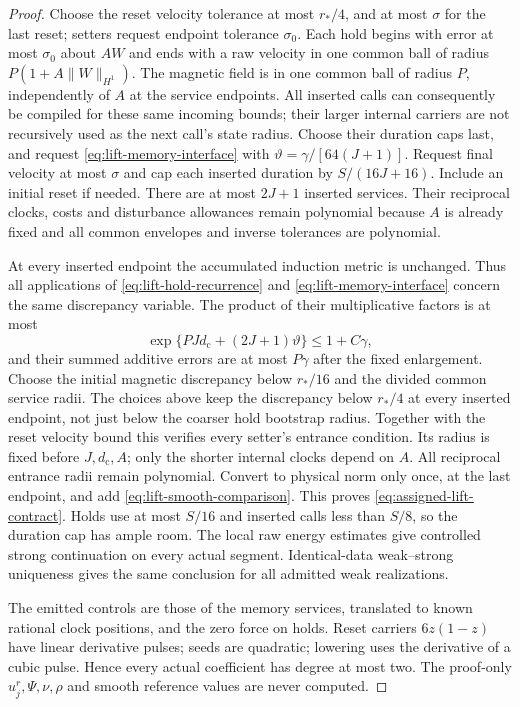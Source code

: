\documentclass[11pt,a4paper]{amsart}
\theoremstyle{definition}
\theoremstyle{remark}
\numberwithin{equation}{section}
\newcommand{\norm}[1]{\lVert #1\rVert}
\begin{document}
\begin{proof}
Choose the reset velocity tolerance at most $r_*/4$, and at most $\sigma$
for the last reset; setters request endpoint tolerance $\sigma_0$.
Each hold begins with error at most $\sigma_0$ about $AW$ and ends with a raw velocity in one
common ball of radius $P(1+A\norm W_{H^1})$.  The magnetic field is in one
common ball of radius $P$, independently of $A$ at the service endpoints.
All inserted calls can consequently be compiled for these same incoming
bounds; their larger internal carriers are not recursively used as the next
call's state radius.  Choose their duration caps last, and request
\eqref{eq:lift-memory-interface} with
$\vartheta=\gamma/[64(J+1)]$.  Request final velocity at most $\sigma$ and
cap each inserted duration by $S/(16J+16)$.  Include an initial reset if
needed.  There are at most $2J+1$ inserted services.  Their reciprocal clocks,
costs and disturbance allowances remain polynomial because $A$ is already
fixed and all common envelopes and inverse tolerances are polynomial.

At every inserted endpoint the accumulated induction metric is unchanged.
Thus all applications of \eqref{eq:lift-hold-recurrence} and
\eqref{eq:lift-memory-interface} concern the same discrepancy variable.
The product of their multiplicative factors is at most
\[
 \exp\{PJd_{\mathrm c}+(2J+1)\vartheta\}\le1+C\gamma,
\]
and their summed additive errors are at most $P\gamma$ after the fixed
enlargement. Choose the initial magnetic discrepancy below $r_*/16$ and
the divided common service radii. The choices above keep the discrepancy
below $r_*/4$ at every inserted endpoint, not just below the coarser
hold bootstrap radius. Together with the reset velocity bound this verifies
every setter's entrance condition. Its radius is fixed before $J,d_{\mathrm c},A$;
only the shorter internal clocks depend on $A$. All reciprocal entrance
radii remain polynomial. Convert to physical norm only once, at the
last endpoint, and add \eqref{eq:lift-smooth-comparison}.  This proves
\eqref{eq:assigned-lift-contract}.  Holds use at most $S/16$ and inserted
calls less than $S/8$, so the duration cap has ample room.  The local raw
energy estimates give controlled strong continuation on every actual
segment.  Identical-data weak--strong uniqueness gives the same conclusion
for all admitted weak realizations.

The emitted controls are those of the memory services, translated to known
rational clock positions, and the zero force on holds.  Reset carriers
$6z(1-z)$ have linear derivative pulses; seeds are quadratic; lowering uses
the derivative of a cubic pulse.  Hence every actual coefficient has degree
at most two.  The proof-only $u_j^r,\Psi,\nu,\rho$ and smooth reference
values are never computed.
\end{proof}
\end{document}
